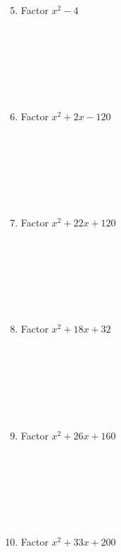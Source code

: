 \documentclass{article}
\begin{document}
\begin{minipage}[t]{0.45\textwidth}
    \begin{enumerate}
        \setcounter{enumi}{4} %
        \item Factor $x^2 - 4$
        \\\\\\\\\\\\\\
        \item Factor $x^2 + 2x - 120$
        \\\\\\\\\\\\\\
        \item Factor $x^2 + 22x + 120$
        \\\\\\\\\\\\\\
        \item Factor $x^2 + 18x + 32$
        \\\\\\\\\\\\\\
        \item Factor $x^2 + 26x + 160$
        \\\\\\\\\\\\\\
        \item Factor $x^2 + 33x + 200$
        

    \end{enumerate}
\end{minipage}
\end{document}
